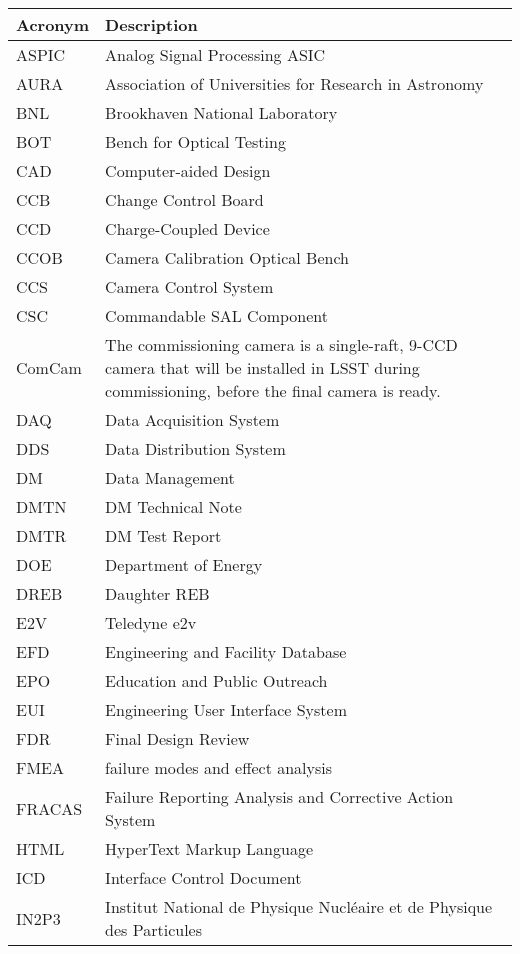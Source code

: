 \addtocounter{table}{-1}
\begin{longtable}{p{}p{}}\hline
\textbf{Acronym} & \textbf{Description}  \\\hline

ASPIC & Analog Signal Processing ASIC \\\hline
AURA & Association of Universities for Research in Astronomy \\\hline
BNL & Brookhaven National Laboratory \\\hline
BOT & Bench for Optical Testing \\\hline
CAD & Computer-aided Design \\\hline
CCB & Change Control Board \\\hline
CCD & Charge-Coupled Device \\\hline
CCOB & Camera Calibration Optical Bench \\\hline
CCS & Camera Control System \\\hline
CSC & Commandable SAL Component \\\hline
ComCam & The commissioning camera is a single-raft, 9-CCD camera that will be installed in LSST during commissioning, before the final camera is ready. \\\hline
DAQ & Data Acquisition System \\\hline
DDS & Data Distribution System \\\hline
DM & Data Management \\\hline
DMTN & DM Technical Note \\\hline
DMTR & DM Test Report \\\hline
DOE & Department of Energy \\\hline
DREB & Daughter REB \\\hline
E2V & Teledyne e2v \\\hline
EFD & Engineering and Facility Database \\\hline
EPO & Education and Public Outreach \\\hline
EUI & Engineering User Interface System \\\hline
FDR & Final Design Review \\\hline
FMEA & failure modes and effect analysis \\\hline
FRACAS & Failure Reporting Analysis and Corrective Action System \\\hline
HTML & HyperText Markup Language \\\hline
ICD & Interface Control Document \\\hline
IN2P3 & Institut National de Physique Nucléaire et de Physique des Particules \\\hline

\end{longtable}
